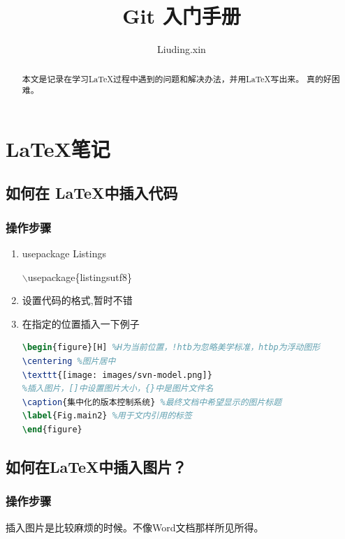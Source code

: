 \documentclass[UTF8]{ctexart}
\begin{document}
\title{Git 入门手册}
\author{Liuding.xin}
\maketitle

\begin{abstract}
    本文是记录在学习\LaTeX 过程中遇到的问题和解决办法，并用\LaTeX 写出来。
    真的好困难。
\end{abstract}


\newpage







\section{\LaTeX 笔记}
\subsection{如何在 \LaTeX 中插入代码} %
\subsubsection{操作步骤} %

\begin{enumerate}
    \item usepackage Listings

          $\backslash$usepackage\{listingsutf8\}

    \item 设置代码的格式,暂时不错
    \item 在指定的位置插入一下例子
    \label{Code.Insert_pic}
          \begin{lstlisting}[language={tex}]
\begin{figure}[H] %H为当前位置，!htb为忽略美学标准，htbp为浮动图形
\centering %图片居中
\texttt{[image: images/svn-model.png]} 
%插入图片，[]中设置图片大小，{}中是图片文件名
\caption{集中化的版本控制系统} %最终文档中希望显示的图片标题
\label{Fig.main2} %用于文内引用的标签
\end{figure}
          \end{lstlisting}


        \end{enumerate}
\subsection{如何在\LaTeX 中插入图片？}
\subsubsection{操作步骤}
插入图片是比较麻烦的时候。不像Word文档那样所见所得。
\end{document}
